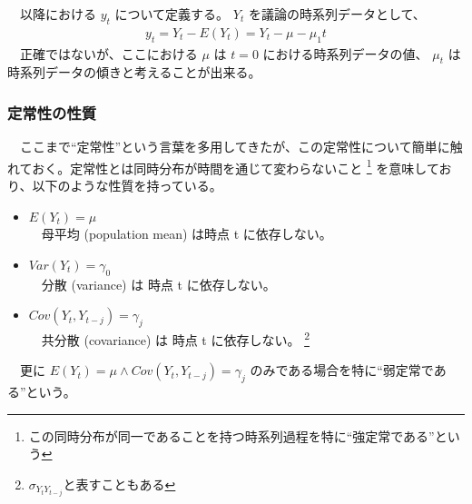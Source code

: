 \documentclass{scrartcl}
\begin{document}
　以降における \(y_t\) について定義する。 \(Y_t\) を議論の時系列データとして、\\
\begin{align}
y_t = Y_t - E(Y_t) = Y_t - \mu - \mu_1 t
\end{align}
　正確ではないが、ここにおける \(\mu\) は \(t = 0\) における時系列データの値、 \(\mu_t\) は 時系列データの傾きと考えることが出来る。\\

\subsubsection{定常性の性質}
\label{sec:org434eb10}
　ここまで``定常性''という言葉を多用してきたが、この定常性について簡単に触れておく。定常性とは同時分布が時間を通じて変わらないこと \footnote{この同時分布が同一であることを持つ時系列過程を特に``強定常である''という} を意味しており、以下のような性質を持っている。\\

\begin{itemize}
\item \(E(Y_t) = \mu\) \\
　母平均 (population mean) は時点 t に依存しない。\\
\item \(Var(Y_t) = \gamma_0\) \\
　分散 (variance) は 時点 t に依存しない。\\
\item \(Cov(Y_t, Y_{t-j}) = \gamma_j\) \\
　共分散 (covariance) は 時点 t に依存しない。 \footnote{$\sigma_{Y_t Y_{t-j}}$と表すこともある}
\end{itemize}

　更に \(E(Y_t) = \mu \land Cov(Y_t, Y_{t-j}) = \gamma_j\) のみである場合を特に``弱定常である''という。\\
\end{document}
